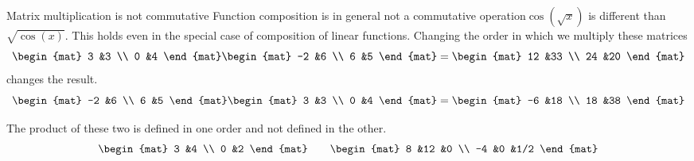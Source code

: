 \begin{frame}{Matrix multiplication is not commutative}
Function composition is in general not a commutative 
operation\Dash $\cos(\sqrt{x})$
is different than $\sqrt{\cos(x)}$.
This holds even in the special case of 
composition of linear functions.
\pause
\ex
Changing the order in which we multiply these matrices
\begin{equation*}
  \begin{mat}
    3  &3  \\
    0  &4
  \end{mat}
  \begin{mat}
    -2  &6  \\
    6   &5
  \end{mat}
  =
  \begin{mat}
    12  &33 \\
    24  &20
  \end{mat}
\end{equation*}
changes the result.
\begin{equation*}
  \begin{mat}
    -2  &6  \\
    6   &5
  \end{mat}
  \begin{mat}
    3  &3  \\
    0  &4
  \end{mat}
  =
  \begin{mat}
     -6  &18   \\
     18  &38  
  \end{mat}
\end{equation*}

\ex
The product of these two
is defined in one order
and not defined in the other.
\begin{equation*}
  \begin{mat}
    3  &4  \\
    0  &2
  \end{mat}
  \qquad
  \begin{mat}
    8  &12  &0 \\
   -4  &0  &1/2
  \end{mat}
\end{equation*}
\end{frame}




